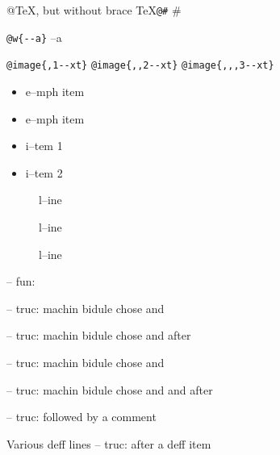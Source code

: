 \documentclass{book}
\begin{document}
\begin{titlepage}
@TeX, but without brace \TeX{}\texttt{@\#} \#

\texttt{@w\{{-}{-}a\}} \hbox{--a}

\texttt{@image\{,1{-}{-}xt\}} 
\texttt{@image\{,,2{-}{-}xt\}} 
\texttt{@image\{,,,3{-}{-}xt\}} 


\begin{itemize}[label=\emph{}]
\item e--mph item
\end{itemize}

\begin{itemize}[label=\emph{} after emph]
\item e--mph item
\end{itemize}

\begin{itemize}[label=\textbullet{} a--n itemize line]
\item i--tem 1
\item i--tem 2
\end{itemize}

\begin{description}
\item[{\parbox[b]{\linewidth}{%
a}}]
l--ine
\end{description}

\begin{description}
\item[{\parbox[b]{\linewidth}{%
a--missing style formatting}}]
l--ine
\end{description}

\begin{description}
\item[{\parbox[b]{\linewidth}{%
a\\
\index[fn]{a@\texttt{a}}%
\index[cp]{index entry between item and itemx}%
b
\index[fn]{b@\texttt{b}}%
}}]
l--ine
\end{description}

\hbox{}-- fun: 


\hbox{}-- truc: machin bidule chose and


%
\hbox{}-- truc: machin bidule chose and  after


%
\hbox{}-- truc: machin bidule chose and 


%
\hbox{}-- truc: machin bidule chose and and after


%
\hbox{}-- truc: followed by a comment


%
Various deff lines
\hbox{}-- truc: after a deff item



\end{titlepage}
\end{document}

